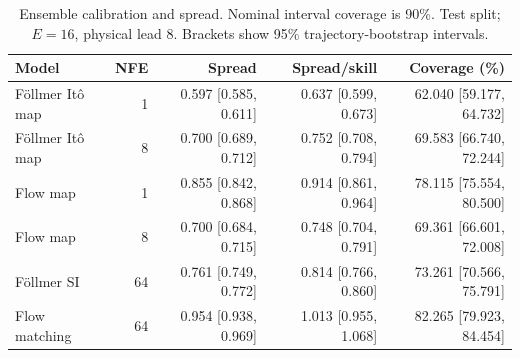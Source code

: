 \begin{table}[t]
\centering
\small
\setlength{\tabcolsep}{3pt}
\caption{Ensemble calibration and spread. Nominal interval coverage is 90\%. Test split; $E=16$, physical lead 8. Brackets show 95\% trajectory-bootstrap intervals.}
\label{tab:map-calibration}
\begin{tabular}{lrrrr}
\toprule
Model & NFE & Spread & Spread/skill & Coverage (\%) \\
\midrule
Föllmer Itô map & 1 & 0.597 [0.585, 0.611] & 0.637 [0.599, 0.673] & 62.040 [59.177, 64.732] \\
Föllmer Itô map & 8 & 0.700 [0.689, 0.712] & 0.752 [0.708, 0.794] & 69.583 [66.740, 72.244] \\
\addlinespace
Flow map & 1 & 0.855 [0.842, 0.868] & 0.914 [0.861, 0.964] & 78.115 [75.554, 80.500] \\
Flow map & 8 & 0.700 [0.684, 0.715] & 0.748 [0.704, 0.791] & 69.361 [66.601, 72.008] \\
\addlinespace
Föllmer SI & 64 & 0.761 [0.749, 0.772] & 0.814 [0.766, 0.860] & 73.261 [70.566, 75.791] \\
\addlinespace
Flow matching & 64 & 0.954 [0.938, 0.969] & 1.013 [0.955, 1.068] & 82.265 [79.923, 84.454] \\
\bottomrule
\end{tabular}
\end{table}
